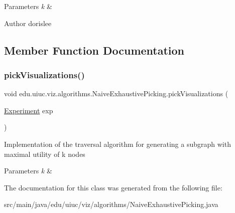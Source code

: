\begin{DoxyParams}{Parameters}
{\em k} & \\
\hline
\end{DoxyParams}
\begin{DoxyAuthor}{Author}
dorislee 
\end{DoxyAuthor}


\subsection{Member Function Documentation}
\mbox{\label{classedu_1_1uiuc_1_1viz_1_1algorithms_1_1_naive_exhaustive_picking_a20999a527bdc67d6227300611db8d2fa}} 
\subsubsection{\texorpdfstring{pickVisualizations()}{pickVisualizations()}}
{\footnotesize\ttfamily void edu.\+uiuc.\+viz.\+algorithms.\+Naive\+Exhaustive\+Picking.\+pick\+Visualizations (\begin{DoxyParamCaption}\item[{\mbox{\hyperlink{classedu_1_1uiuc_1_1viz_1_1algorithms_1_1_experiment}{Experiment}}}]{exp }\end{DoxyParamCaption})}

Implementation of the traversal algorithm for generating a subgraph with maximal utility of k nodes


\begin{DoxyParams}{Parameters}
{\em k} & \\
\hline
\end{DoxyParams}


The documentation for this class was generated from the following file\+:\begin{DoxyCompactItemize}
\item 
src/main/java/edu/uiuc/viz/algorithms/Naive\+Exhaustive\+Picking.\+java\end{DoxyCompactItemize}
